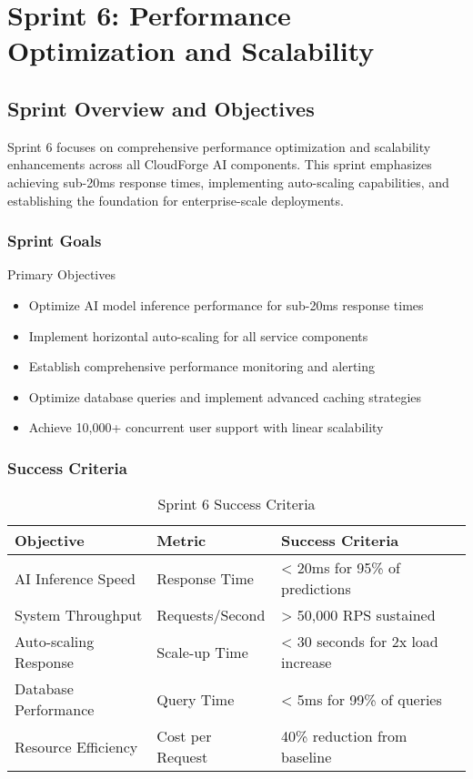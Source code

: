 \chapter{Sprint 6: Performance Optimization and Scalability}

\section{Sprint Overview and Objectives}

Sprint 6 focuses on comprehensive performance optimization and scalability enhancements across all CloudForge AI components. This sprint emphasizes achieving sub-20ms response times, implementing auto-scaling capabilities, and establishing the foundation for enterprise-scale deployments.

\subsection{Sprint Goals}

\begin{sprintbox}{Primary Objectives}
\begin{itemize}
    \item Optimize AI model inference performance for sub-20ms response times
    \item Implement horizontal auto-scaling for all service components
    \item Establish comprehensive performance monitoring and alerting
    \item Optimize database queries and implement advanced caching strategies
    \item Achieve 10,000+ concurrent user support with linear scalability
\end{itemize}
\end{sprintbox}

\subsection{Success Criteria}

\begin{table}[H]
\centering
\caption{Sprint 6 Success Criteria}
\begin{tabular}{|p{4cm}|p{3cm}|p{5cm}|}
\hline
\textbf{Objective} & \textbf{Metric} & \textbf{Success Criteria} \\
\hline
AI Inference Speed & Response Time & < 20ms for 95\% of predictions \\
\hline
System Throughput & Requests/Second & > 50,000 RPS sustained \\
\hline
Auto-scaling Response & Scale-up Time & < 30 seconds for 2x load increase \\
\hline
Database Performance & Query Time & < 5ms for 99\% of queries \\
\hline
Resource Efficiency & Cost per Request & 40\% reduction from baseline \\
\hline
\end{tabular}
\end{table}

